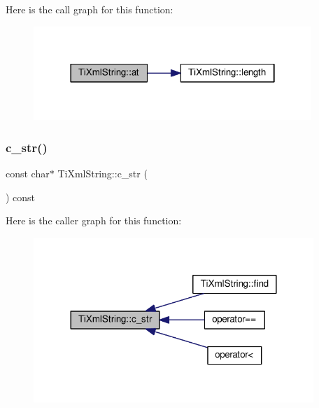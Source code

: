 Here is the call graph for this function\+:
\nopagebreak
\begin{figure}[H]
\begin{center}
\leavevmode
\includegraphics[width=298pt]{class_ti_xml_string_a7f33c37f7dfde5193f02521d2a7af1db_cgraph}
\end{center}
\end{figure}
\mbox{\label{class_ti_xml_string_ae2bd36349215612ebcc3cb221c30bd3d}} 
\subsubsection{\texorpdfstring{c\+\_\+str()}{c\_str()}}
{\footnotesize\ttfamily const char$\ast$ Ti\+Xml\+String\+::c\+\_\+str (\begin{DoxyParamCaption}{ }\end{DoxyParamCaption}) const\hspace{0.3cm}{\ttfamily [inline]}}

Here is the caller graph for this function\+:
\nopagebreak
\begin{figure}[H]
\begin{center}
\leavevmode
\includegraphics[width=300pt]{class_ti_xml_string_ae2bd36349215612ebcc3cb221c30bd3d_icgraph}
\end{center}
\end{figure}
\mbox{\label{class_ti_xml_string_a0ca248f026e698f79b8aa4c9ab8e1571}} 
